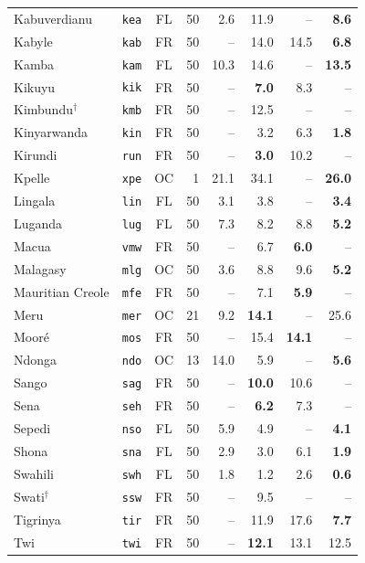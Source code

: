\documentclass[10pt,twocolumn]{article}
\begin{document}
\begin{table}[h!]
\begin{tabular}{llcrrrrr}
Kabuverdianu & \texttt{kea} & FL & 50 & 2.6 & 11.9 & -- & \textbf{8.6} \\
Kabyle & \texttt{kab} & FR & 50 & -- & 14.0 & 14.5 & \textbf{6.8} \\
Kamba & \texttt{kam} & FL & 50 & 10.3 & 14.6 & -- & \textbf{13.5} \\
Kikuyu & \texttt{kik} & FR & 50 & -- & \textbf{7.0} & 8.3 & -- \\
Kimbundu$^\dagger$ & \texttt{kmb} & FR & 50 & -- & 12.5 & -- & -- \\
Kinyarwanda & \texttt{kin} & FR & 50 & -- & 3.2 & 6.3 & \textbf{1.8} \\
Kirundi & \texttt{run} & FR & 50 & -- & \textbf{3.0} & 10.2 & -- \\
Kpelle & \texttt{xpe} & OC & 1 & 21.1 & 34.1 & -- & \textbf{26.0} \\
Lingala & \texttt{lin} & FL & 50 & 3.1 & 3.8 & -- & \textbf{3.4} \\
Luganda & \texttt{lug} & FL & 50 & 7.3 & 8.2 & 8.8 & \textbf{5.2} \\
Macua & \texttt{vmw} & FR & 50 & -- & 6.7 & \textbf{6.0} & -- \\
Malagasy & \texttt{mlg} & OC & 50 & 3.6 & 8.8 & 9.6 & \textbf{5.2} \\
Mauritian Creole & \texttt{mfe} & FR & 50 & -- & 7.1 & \textbf{5.9} & -- \\
Meru & \texttt{mer} & OC & 21 & 9.2 & \textbf{14.1} & -- & 25.6 \\
Mooré & \texttt{mos} & FR & 50 & -- & 15.4 & \textbf{14.1} & -- \\
Ndonga & \texttt{ndo} & OC & 13 & 14.0 & 5.9 & -- & \textbf{5.6} \\
Sango & \texttt{sag} & FR & 50 & -- & \textbf{10.0} & 10.6 & -- \\
Sena & \texttt{seh} & FR & 50 & -- & \textbf{6.2} & 7.3 & -- \\
Sepedi & \texttt{nso} & FL & 50 & 5.9 & 4.9 & -- & \textbf{4.1} \\
Shona & \texttt{sna} & FL & 50 & 2.9 & 3.0 & 6.1 & \textbf{1.9} \\
Swahili & \texttt{swh} & FL & 50 & 1.8 & 1.2 & 2.6 & \textbf{0.6} \\
Swati$^\dagger$ & \texttt{ssw} & FR & 50 & -- & 9.5 & -- & -- \\
Tigrinya & \texttt{tir} & FR & 50 & -- & 11.9 & 17.6 & \textbf{7.7} \\
Twi & \texttt{twi} & FR & 50 & -- & \textbf{12.1} & 13.1 & 12.5 \\

\end{tabular}
\end{table}
\end{document}
